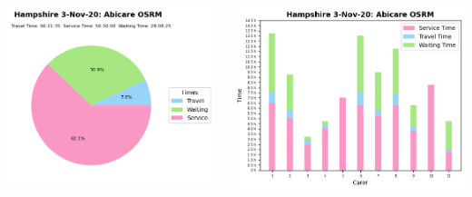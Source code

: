\documentclass[usenames,dvipsnames]{beamer}
\begin{document}
\begin{frame} %
	\begin{columns}
		\begin{minipage}[c][0.45\textheight][c]{\linewidth}
			\centering
			\includegraphics[width=1\linewidth]{figures/3_Nov_20_Hampshire_time_info_abiosrm}
		\end{minipage}
		\begin{minipage}[c][0.45\textheight][c]{\linewidth}
			\vspace{5mm}
			\centering
			\includegraphics[width=1\linewidth]{figures/3_Nov_20_Hampshire_workload_abiosrm}

\end{minipage}
\end{columns}
\end{frame}
\end{document}
